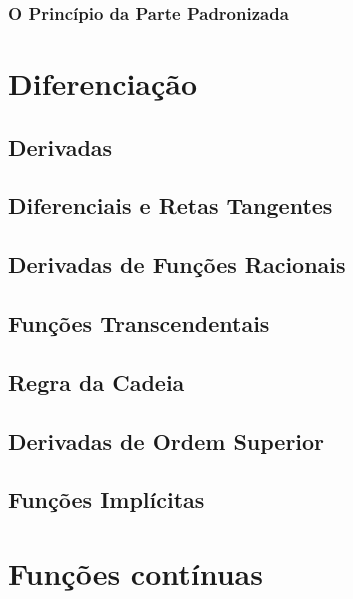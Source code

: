 \documentclass{svmono}
\begin{document}
\subsection{O Princípio da Parte Padronizada}
\label{sec:stpartprinciple}

\chapterproblems

\chapter{Diferenciação}
\label{chp:diff}

\section{Derivadas}
\label{sec:derivatives}

\section{Diferenciais e Retas Tangentes}
\label{sec:tglines}

\section{Derivadas de Funções Racionais}
\label{sec:derivratfunc}

\section{Funções Transcendentais}
\label{sec:transcfunc}

\section{Regra da Cadeia}
\label{sec:chainrule}

\section{Derivadas de Ordem Superior}
\label{sec:higherderivs}

\section{Funções Implícitas}
\label{sec:implicitfunc}

\chapterproblems

\chapter{Funções contínuas}
\label{chp:contfunc}
\end{document}

